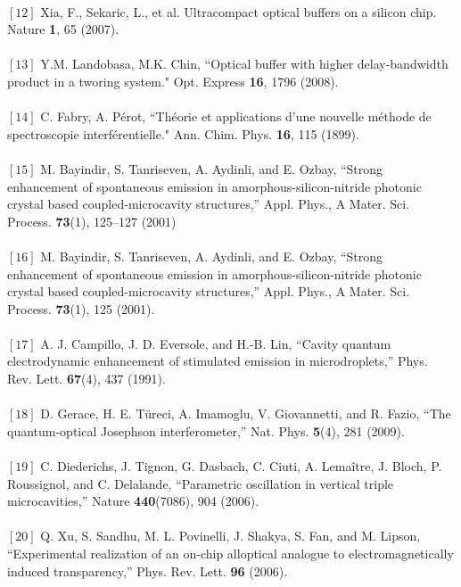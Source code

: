 {\\$[12]$ Xia, F., Sekaric, L., et al. Ultracompact optical buffers on a silicon chip. Nature \textbf{1}, 65
(2007).\\
\\$[13]$ Y.M. Landobasa, M.K. Chin,  “Optical buffer with higher delay-bandwidth product in a tworing system." Opt. Express \textbf{16}, 1796 (2008).\\
\\$[14]$ C. Fabry, A. Pérot, “Théorie et applications d’une nouvelle méthode de spectroscopie interférentielle." Ann. Chim. Phys. \textbf{16}, 115 (1899).\\
\\$[15]$ M. Bayindir, S. Tanriseven, A. Aydinli, and E. Ozbay, “Strong enhancement of spontaneous emission in
amorphous-silicon-nitride photonic crystal based coupled-microcavity structures,” Appl. Phys., A Mater. Sci.
Process. \textbf{73}(1), 125–127 (2001)\\
\\$[16]$ M. Bayindir, S. Tanriseven, A. Aydinli, and E. Ozbay, “Strong enhancement of spontaneous emission in
amorphous-silicon-nitride photonic crystal based coupled-microcavity structures,” Appl. Phys., A Mater. Sci.
Process. \textbf{73}(1), 125 (2001).\\
\\$[17]$ A. J. Campillo, J. D. Eversole, and H.-B. Lin, “Cavity quantum electrodynamic enhancement of stimulated
emission in microdroplets,” Phys. Rev. Lett. \textbf{67}(4), 437 (1991).\\
\\$[18]$ D. Gerace, H. E. Türeci, A. Imamoglu, V. Giovannetti, and R. Fazio, “The quantum-optical Josephson
interferometer,” Nat. Phys. \textbf{5}(4), 281 (2009).\\
\\$[19]$  C. Diederichs, J. Tignon, G. Dasbach, C. Ciuti, A. Lemaître, J. Bloch, P. Roussignol, and C. Delalande,
“Parametric oscillation in vertical triple microcavities,” Nature \textbf{440}(7086), 904 (2006).\\
\\$[20]$ Q. Xu, S. Sandhu, M. L. Povinelli, J. Shakya, S. Fan, and M. Lipson, “Experimental realization of an on-chip alloptical analogue to electromagnetically induced transparency,” Phys. Rev. Lett. \textbf{96} (2006).}

